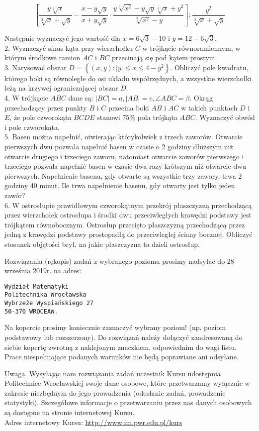 \documentclass[10pt]{article}
\begin{document}
$$
\left[\frac{y \sqrt[3]{x}}{\sqrt[3]{x}+\sqrt{y}}-\frac{x-y \sqrt{y}}{x+y \sqrt{y}} \cdot \frac{y \sqrt[3]{x^{2}}-y \sqrt{y} \sqrt[3]{x}+y^{2}}{\sqrt[3]{x^{2}}-y}\right]: \frac{y^{2}}{\sqrt[3]{x}+\sqrt{y}}
$$

Następnie wyznaczyć jego wartość dla $x=6 \sqrt{3}-10$ i $y=12-6 \sqrt{3}$.\\
2. Wyznaczyć sinus kąta przy wierzchołku $C$ w trójkącie równoramiennym, w którym środkowe ramion $A C$ i $B C$ przecinają się pod kątem prostym.\\
3. Narysować obszar $D=\left\{(x, y):|y| \leqslant x \leqslant 4-y^{2}\right\}$. Obliczyć pole kwadratu, którego boki są równoległe do osi układu współrzędnych, a wszystkie wierzchołki leżą na krzywej ograniczającej obszar $D$.\\
4. W trójkącie $A B C$ dane są: $|B C|=a,|A B|=c, \angle A B C=\beta$. Okrąg przechodzący przez punkty $B$ i $C$ przecina boki $A B$ i $A C$ w takich punktach $D$ i $E$, że pole czworokąta $B C D E$ stanowi $75 \%$ pola trójkąta $A B C$. Wyznaczyć obwód i pole czworokąta.\\
5. Basen można napełnić, otwierając którykolwiek z trzech zaworów. Otwarcie pierwszych dwu pozwala napełnić basen w czasie o 2 godziny dłuższym niż otwarcie drugiego i trzeciego zaworu, natomiast otwarcie zaworów pierwszego i trzeciego pozwala napełnić basen w czasie dwa razy krótszym niż otwarcie dwu pierwszych. Napełnienie basenu, gdy otwarte są wszystkie trzy zawory, trwa 2 godziny 40 minut. Ile trwa napełnienie basenu, gdy otwarty jest tylko jeden zawór?\\
6. W ostrosłupie prawidłowym czworokątnym przekrój płaszczyzną przechodzącą przez wierzchołek ostrosłupa i środki dwu przeciwległych krawędzi podstawy jest trójkątem równobocznym. Ostrosłup przecięto płaszczyzną przechodzącą przez jedną z krawędzi podstawy prostopadłą do przeciwległej ściany bocznej. Obliczyć stosunek objętości brył, na jakie płaszczyzna ta dzieli ostrosłup.

Rozwiązania (rękopis) zadań z wybranego poziomu prosimy nadsyłać do 28 września 2019r. na adres:

\begin{verbatim}
Wydział Matematyki
Politechnika Wrocławska
Wybrzeże Wyspiańskiego 27
50-370 WROCEAW.
\end{verbatim}

Na kopercie prosimy koniecznie zaznaczyć wybrany poziom! (np. poziom podstawowy lub rozszerzony). Do rozwiązań należy dołączyć zaadresowaną do siebie kopertę zwrotną z naklejonym znaczkiem, odpowiednim do wagi listu. Prace niespełniające podanych warunków nie będą poprawiane ani odsyłane.

Uwaga. Wysyłając nam rozwiązania zadań uczestnik Kursu udostępnia Politechnice Wrocławskiej swoje dane osobowe, które przetwarzamy wyłącznie w zakresie niezbędnym do jego prowadzenia (odesłanie zadań, prowadzenie statystyki). Szczegółowe informacje o przetwarzaniu przez nas danych osobowych są dostępne na stronie internetowej Kursu.\\
Adres internetowy Kursu: \href{http://www.im.pwr.edu.pl/kurs}{http://www.im.pwr.edu.pl/kurs}
\end{document}
